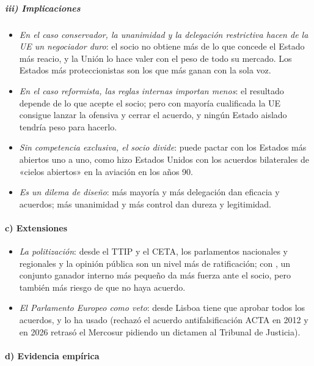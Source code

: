\documentclass[11pt]{article}
\begin{document}
\subparagraph{iii) Implicaciones}

\begin{itemize}
\item \emph{En el caso conservador, la unanimidad y la delegación restrictiva hacen de la UE un negociador duro}: el socio no obtiene más de lo que concede el Estado más reacio, y la Unión lo hace valer con el peso de todo su mercado. Los Estados más proteccionistas son los que más ganan con la sola voz.
\item \emph{En el caso reformista, las reglas internas importan menos}: el resultado depende de lo que acepte el socio; pero con mayoría cualificada la UE consigue lanzar la ofensiva y cerrar el acuerdo, y ningún Estado aislado tendría peso para hacerlo.
\item \emph{Sin competencia exclusiva, el socio divide}: puede pactar con los Estados más abiertos uno a uno, como hizo Estados Unidos con los acuerdos bilaterales de «cielos abiertos» en la aviación en los años 90.
\item \emph{Es un dilema de diseño}: más mayoría y más delegación dan eficacia y acuerdos; más unanimidad y más control dan dureza y legitimidad.
\end{itemize}

\paragraph{c) Extensiones}

\begin{itemize}
\item \emph{La politización}: desde el TTIP y el CETA, los parlamentos nacionales y regionales y la opinión pública son un nivel más de ratificación; con , un conjunto ganador interno más pequeño da más fuerza ante el socio, pero también más riesgo de que no haya acuerdo.
\item \emph{El Parlamento Europeo como veto}: desde Lisboa tiene que aprobar todos los acuerdos, y lo ha usado (rechazó el acuerdo antifalsificación ACTA en 2012 y en 2026 retrasó el Mercosur pidiendo un dictamen al Tribunal de Justicia).
\end{itemize}

\paragraph{d) Evidencia empírica}
\end{document}
